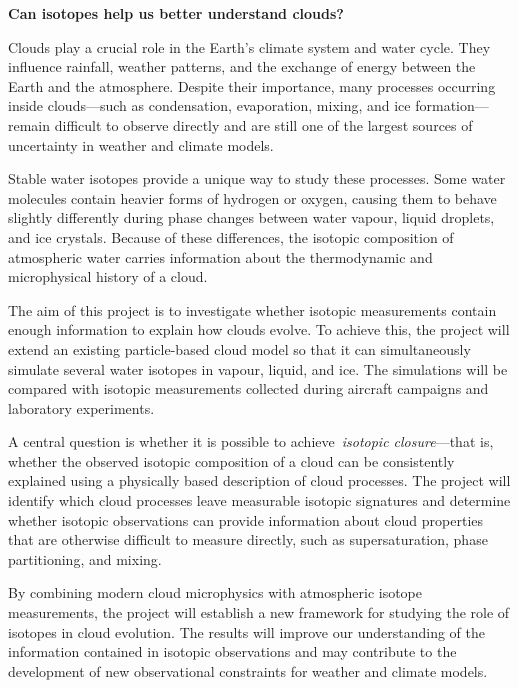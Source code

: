 \documentclass[11pt,a4paper]{article}
\newif\ifen
\begin{document}
\ifen

\begin{center}
\Large\textbf{Can isotopes help us better understand clouds?}
\end{center}

Clouds play a crucial role in the Earth's climate system and water cycle. They influence rainfall, weather patterns, and the exchange of energy between the Earth and the atmosphere. Despite their importance, many processes occurring inside clouds—such as condensation, evaporation, mixing, and ice formation—remain difficult to observe directly and are still one of the largest sources of uncertainty in weather and climate models.

Stable water isotopes provide a unique way to study these processes. Some water molecules contain heavier forms of hydrogen or oxygen, causing them to behave slightly differently during phase changes between water vapour, liquid droplets, and ice crystals. Because of these differences, the isotopic composition of atmospheric water carries information about the thermodynamic and microphysical history of a cloud.

The aim of this project is to investigate whether isotopic measurements contain enough information to explain how clouds evolve. To achieve this, the project will extend an existing particle-based cloud model so that it can simultaneously simulate several water isotopes in vapour, liquid, and ice. The simulations will be compared with isotopic measurements collected during aircraft campaigns and laboratory experiments.

A central question is whether it is possible to achieve \textit{isotopic closure}—that is, whether the observed isotopic composition of a cloud can be consistently explained using a physically based description of cloud processes. The project will identify which cloud processes leave measurable isotopic signatures and determine whether isotopic observations can provide information about cloud properties that are otherwise difficult to measure directly, such as supersaturation, phase partitioning, and mixing.

By combining modern cloud microphysics with atmospheric isotope measurements, the project will establish a new framework for studying the role of isotopes in cloud evolution. The results will improve our understanding of the information contained in isotopic observations and may contribute to the development of new observational constraints for weather and climate models.
\end{document}
